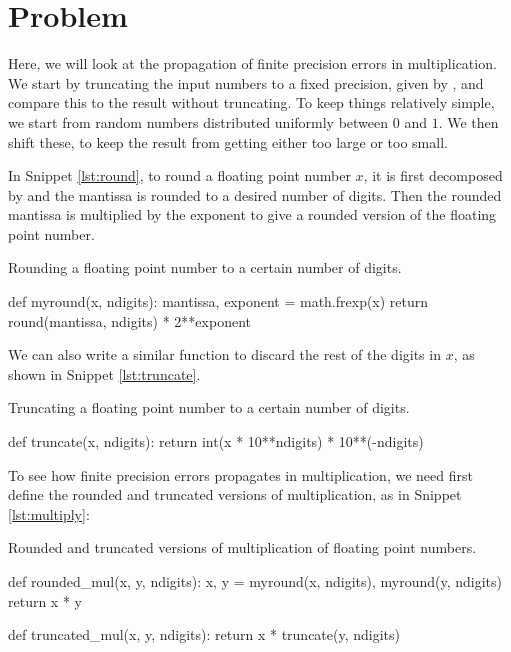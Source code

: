 \section{Problem \thesection}\label{sec:p1}

Here, we will look at the propagation of finite precision errors in
multiplication. We start by truncating the input numbers to a fixed precision, given by
, and compare this to the result without truncating. To keep things relatively simple,
we start from random numbers distributed uniformly between $0$ and $1$. We then shift these,
to keep the result from getting either too large or too small.

In Snippet \ref{lst:round}, to round a floating point number $x$, it is first decomposed by
 and the mantissa is rounded to a desired number of digits. Then the
rounded mantissa is multiplied by the exponent to give a rounded version of the floating
point number.

\begin{algorithm}
    \caption{Rounding a floating point number to a certain number of digits.}
    \label{lst:round}
    \begin{pythoncode}
        def myround(x, ndigits):
            mantissa, exponent = math.frexp(x)
            return round(mantissa, ndigits) * 2**exponent
    \end{pythoncode}
\end{algorithm}

We can also write a similar  function to discard the rest of the digits
in $x$, as shown in Snippet \ref{lst:truncate}.

\begin{algorithm}
    \caption{Truncating a floating point number to a certain number of digits.}
    \label{lst:truncate}
    \begin{pythoncode}
        def truncate(x, ndigits):
            return int(x * 10**ndigits) * 10**(-ndigits)
    \end{pythoncode}
\end{algorithm}

To see how finite precision errors propagates in multiplication, we need first define the
rounded and truncated versions of multiplication, as in Snippet \ref{lst:multiply}:

\begin{algorithm}
    \caption{Rounded and truncated versions of multiplication of floating point numbers.}
    \label{lst:multiply}
    \begin{pythoncode}
        def rounded_mul(x, y, ndigits):
            x, y = myround(x, ndigits), myround(y, ndigits)
            return x * y


        def truncated_mul(x, y, ndigits):
            return x * truncate(y, ndigits)
    \end{pythoncode}
\end{algorithm}


